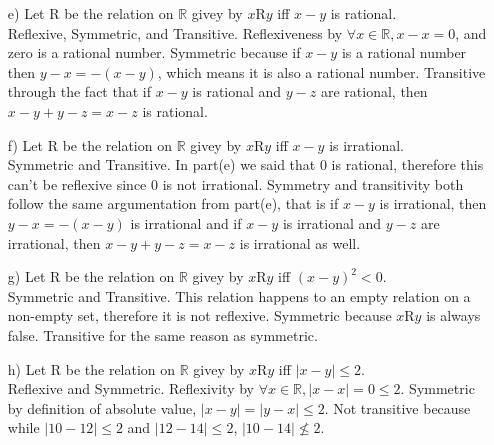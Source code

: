 \documentclass[12pt]{article}
\begin{document}
\begin{enumerate}
\begin{enumerate}
\item[e)] Let {\large R} be the relation on $\mathbb{R}$ givey by $x${\large R}$y$ iff $x - y$ is rational. \\
Reflexive, Symmetric, and Transitive. Reflexiveness by $\forall x \in \mathbb{R}, x - x = 0$, and zero is a rational number. Symmetric because if $x - y$ is a rational number then $y - x = -(x - y)$, which means it
is also a rational number. Transitive through the fact that if $x - y$ is rational and $y - z$ are rational, then $x - y + y - z = x - z$ is rational.
\item[f)] Let {\large R} be the relation on $\mathbb{R}$ givey by $x${\large R}$y$ iff $x - y$ is irrational. \\
Symmetric and Transitive. In part(e) we said that 0 is rational, therefore this can't be reflexive since 0 is not irrational. Symmetry and transitivity both follow the same argumentation from part(e), that is if $x - y$ is irrational, then $y - x = -(x - y)$ is irrational and if $x - y$ is irrational and $y - z$ are irrational, then $x - y + y - z = x - z$ is irrational as well.
\item[g)] Let {\large R} be the relation on $\mathbb{R}$ givey by $x${\large R}$y$ iff $(x - y)^2 < 0$. \\
Symmetric and Transitive. This relation happens to an empty relation on a non-empty set, therefore it is not reflexive. Symmetric because $x${\large R}$y$ is always false. Transitive for the same reason as symmetric.
\item[h)] Let {\large R} be the relation on $\mathbb{R}$ givey by $x${\large R}$y$ iff $| x - y | \leq 2$. \\
Reflexive and Symmetric. Reflexivity by $\forall x \in \mathbb{R}, |x - x| = 0 \leq 2$. Symmetric by definition of absolute value, $|x - y| = |y - x| \leq 2$. Not transitive because while $|10 - 12| \leq 2$ and $|12 - 14| \leq 2$, $|10 - 14| \not\leq 2$.
\end{enumerate}


\end{enumerate}
\end{document}

